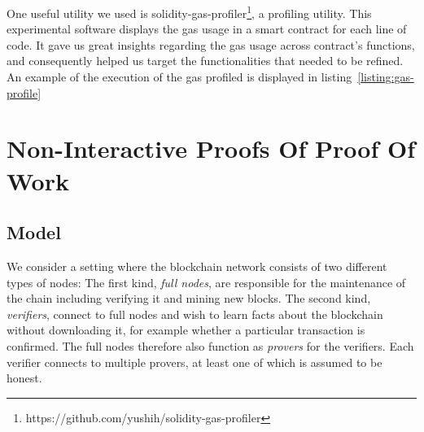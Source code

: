 One useful utility we used is
solidity-gas-profiler\footnote{https://github.com/yushih/solidity-gas-profiler},
a profiling utility. This experimental software displays the gas usage in a
smart contract for each line of code. It gave us great insights regarding the
gas usage across contract’s functions, and consequently helped us target the
functionalities that needed to be refined. An example of the execution of the
gas profiled is displayed in listing~\ref{listing:gas-profile}



\section{Non-Interactive Proofs Of Proof Of Work}

\subsection{Model}
We consider a setting where the blockchain network consists of two different
types of nodes: The first kind, \emph{full nodes}, are responsible for the
maintenance of the chain including verifying it and mining new blocks. The
second kind, \emph{verifiers}, connect to full nodes and wish to learn facts
about the blockchain without downloading it, for example whether a particular
transaction is confirmed. The full nodes therefore also function as
\emph{provers} for the verifiers. Each verifier connects to multiple provers, at
least one of which is assumed to be honest.



